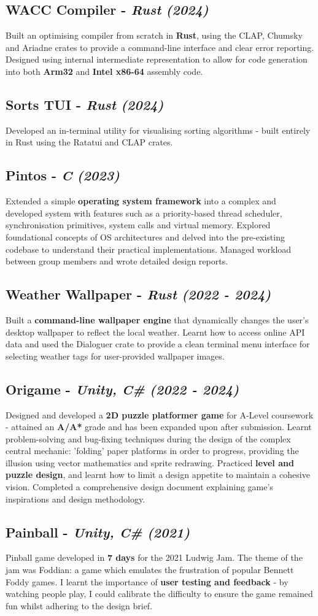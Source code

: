 \documentclass{article}
\newcommand{\dates}[1]{\hfill\textit{(#1)}}
\newcommand{\project}[4]{
    \subsection*{\textbf{#1} - \textit{#3} \dates{#2}}\hfill
    \begin{minipage}{\dimexpr\textwidth - 1em}
        #4
    \end{minipage}
}
\begin{document}
\project{WACC Compiler }{2024}{Rust}{
    Built an optimising compiler from scratch in \textbf{Rust}, using the CLAP, Chumsky and Ariadne crates to provide a command-line interface
    and clear error reporting. Designed using internal intermediate representation to allow for code generation into both
    \textbf{Arm32} and \textbf{Intel x86-64} assembly code.
}

\project{Sorts TUI}{2024}{Rust}{
    Developed an in-terminal utility for visualising sorting algorithms - built entirely in Rust using the Ratatui and CLAP crates.
}

\project{Pintos }{2023}{C}{
    Extended a simple \textbf{operating system framework} into a complex and developed system with features such as a priority-based thread scheduler, 
    synchronisation primitives, system calls and virtual memory. Explored foundational concepts of OS architectures and delved into the
    pre-existing codebase to understand their practical implementations. Managed workload between group members and wrote detailed design reports. 
}

\project{Weather Wallpaper}{2022 - 2024}{Rust}{
    Built a \textbf{command-line wallpaper engine} that dynamically changes the user's desktop wallpaper to reflect the local weather. 
    Learnt how to access online API data and used the Dialoguer crate to provide a clean terminal menu interface for selecting weather tags for 
    user-provided wallpaper images.
}

\project{Origame}{2022 - 2024}{Unity, C\#}{
    Designed and developed a \textbf{2D puzzle platformer game} for A-Level coursework - attained an \textbf{A/A*} grade
    and has been expanded upon after submission. Learnt problem-solving and bug-fixing techniques during the design of the complex central mechanic: 
    'folding' paper platforms in order to progress, providing the illusion using vector mathematics and sprite redrawing.
    Practiced \textbf{level and puzzle design}, and learnt how to limit a design appetite to maintain a cohesive vision.  
    Completed a comprehensive design document explaining game's inspirations and design methodology.
}

\project{Painball}{2021}{Unity, C\#}{
    Pinball game developed in \textbf{7 days} for the 2021 Ludwig Jam. The theme of the jam was Foddian: a game
    which emulates the frustration of popular Bennett Foddy games.
    I learnt the importance of \textbf{user testing and feedback} - by watching people play, I could calibrate the difficulty
    to ensure the game remained fun whilst adhering to the design brief. 
}
    
\end{document}
